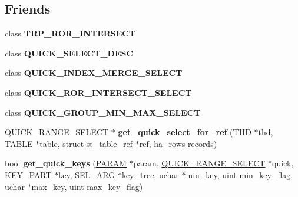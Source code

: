 \subsection*{Friends}
\begin{DoxyCompactItemize}
\item 
\mbox{\label{classQUICK__RANGE__SELECT_ad1fc4ba4a82e97e3b9e0b1163f0efaab}} 
class {\bfseries T\+R\+P\+\_\+\+R\+O\+R\+\_\+\+I\+N\+T\+E\+R\+S\+E\+CT}
\item 
\mbox{\label{classQUICK__RANGE__SELECT_ae6b3d04d320f2f504c0a6d2c5dd80ac4}} 
class {\bfseries Q\+U\+I\+C\+K\+\_\+\+S\+E\+L\+E\+C\+T\+\_\+\+D\+E\+SC}
\item 
\mbox{\label{classQUICK__RANGE__SELECT_afb108c2b3a1b6898598e051ef4b513b3}} 
class {\bfseries Q\+U\+I\+C\+K\+\_\+\+I\+N\+D\+E\+X\+\_\+\+M\+E\+R\+G\+E\+\_\+\+S\+E\+L\+E\+CT}
\item 
\mbox{\label{classQUICK__RANGE__SELECT_a858b030239c415a82a7c5b1ae5b2c08a}} 
class {\bfseries Q\+U\+I\+C\+K\+\_\+\+R\+O\+R\+\_\+\+I\+N\+T\+E\+R\+S\+E\+C\+T\+\_\+\+S\+E\+L\+E\+CT}
\item 
\mbox{\label{classQUICK__RANGE__SELECT_a0297e7cdf150acc33e1738af729d8242}} 
class {\bfseries Q\+U\+I\+C\+K\+\_\+\+G\+R\+O\+U\+P\+\_\+\+M\+I\+N\+\_\+\+M\+A\+X\+\_\+\+S\+E\+L\+E\+CT}
\item 
\mbox{\label{classQUICK__RANGE__SELECT_a0910e4e83cc63d6aac4ef550a58e0aae}} 
\mbox{\hyperlink{classQUICK__RANGE__SELECT}{Q\+U\+I\+C\+K\+\_\+\+R\+A\+N\+G\+E\+\_\+\+S\+E\+L\+E\+CT}} $\ast$ {\bfseries get\+\_\+quick\+\_\+select\+\_\+for\+\_\+ref} (T\+HD $\ast$thd, \mbox{\hyperlink{structTABLE}{T\+A\+B\+LE}} $\ast$table, struct \mbox{\hyperlink{structst__table__ref}{st\+\_\+table\+\_\+ref}} $\ast$ref, ha\+\_\+rows records)
\item 
\mbox{\label{classQUICK__RANGE__SELECT_afc06c77afcce3b1317c6c5169b8d551e}} 
bool {\bfseries get\+\_\+quick\+\_\+keys} (\mbox{\hyperlink{classPARAM}{P\+A\+R\+AM}} $\ast$param, \mbox{\hyperlink{classQUICK__RANGE__SELECT}{Q\+U\+I\+C\+K\+\_\+\+R\+A\+N\+G\+E\+\_\+\+S\+E\+L\+E\+CT}} $\ast$quick, \mbox{\hyperlink{structst__key__part}{K\+E\+Y\+\_\+\+P\+A\+RT}} $\ast$key, \mbox{\hyperlink{classSEL__ARG}{S\+E\+L\+\_\+\+A\+RG}} $\ast$key\+\_\+tree, uchar $\ast$min\+\_\+key, uint min\+\_\+key\+\_\+flag, uchar $\ast$max\+\_\+key, uint max\+\_\+key\+\_\+flag)

\end{DoxyCompactItemize}
